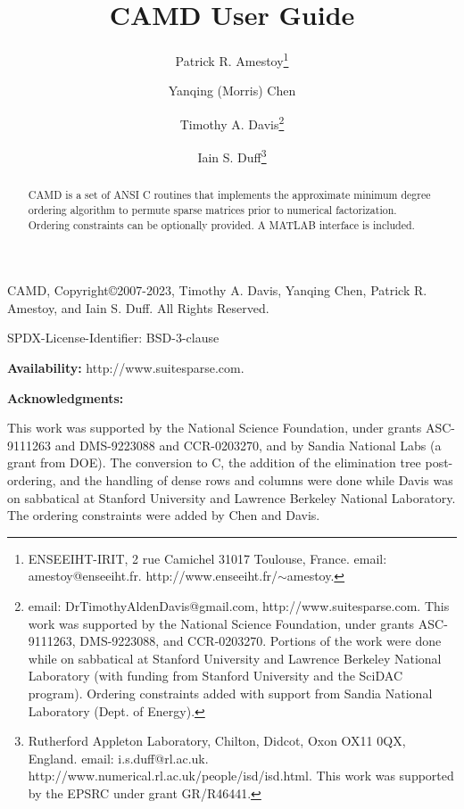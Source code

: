 \documentclass[11pt]{article}
\begin{document}

\title{CAMD User Guide}
\author{Patrick R. Amestoy\thanks{ENSEEIHT-IRIT,
2 rue Camichel 31017 Toulouse, France.
email: amestoy@enseeiht.fr.  http://www.enseeiht.fr/$\sim$amestoy.}
\and Yanqing (Morris) Chen
\and Timothy A. Davis\thanks{
email: DrTimothyAldenDavis@gmail.com,
http://www.suitesparse.com.
This work was supported by the National
Science Foundation, under grants ASC-9111263, DMS-9223088, and CCR-0203270.
Portions of the work were done while on sabbatical at Stanford University
and Lawrence Berkeley National Laboratory (with funding from Stanford
University and the SciDAC program).  Ordering constraints added with
support from Sandia National Laboratory (Dept. of Energy).
}
\and Iain S. Duff\thanks{Rutherford Appleton Laboratory, Chilton, Didcot, 
Oxon OX11 0QX, England. email: i.s.duff@rl.ac.uk.  
http://www.numerical.rl.ac.uk/people/isd/isd.html.
This work was supported by the EPSRC under grant GR/R46441.
}}


\maketitle

\begin{abstract}
CAMD is a set of ANSI C routines that implements the approximate minimum degree
ordering algorithm to permute sparse matrices prior to
numerical factorization.  Ordering constraints can be optionally provided.
A MATLAB interface is included.
\end{abstract}

CAMD, Copyright\copyright 2007-2023, Timothy A. Davis, Yanqing Chen, Patrick R.
Amestoy, and Iain S. Duff.  All Rights Reserved.

SPDX-License-Identifier: BSD-3-clause

{\bf Availability:}
    http://www.suitesparse.com.

{\bf Acknowledgments:}

    This work was supported by the National Science Foundation, under
    grants ASC-9111263 and DMS-9223088 and CCR-0203270, and by Sandia
    National Labs (a grant from DOE).
    The conversion to C, the addition of the elimination tree
    post-ordering, and the handling of dense rows and columns
    were done while Davis was on sabbatical at
    Stanford University and Lawrence Berkeley National Laboratory.
    The ordering constraints were added by Chen and Davis.
\end{document}
